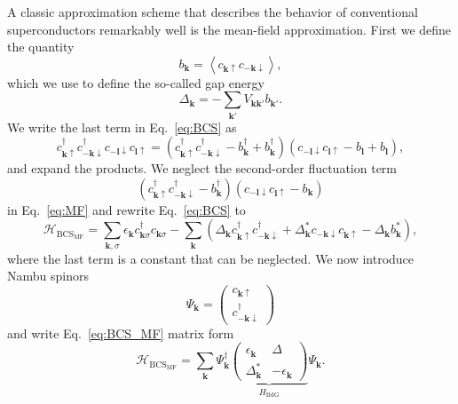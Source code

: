 A classic approximation scheme that describes the behavior of conventional superconductors remarkably well is the mean-field approximation.
First we define the quantity
\begin{equation}
b_{\bm{k}}=\left\langle c_{\bm{k}\uparrow}c_{-\bm{k}\downarrow}\right\rangle ,
\end{equation}
which we use to define the so-called gap energy
\begin{equation}
\Delta_{\bm{k}}=-\sum_{\bm{k'}}V_{\bm{kk'}}b_{\bm{k'}}.
\end{equation}
We write the last term in Eq.~\eqref{eq:BCS} as
\begin{equation}
c_{\bm{k}\uparrow}^{\dagger}c_{-\bm{k}\downarrow}^{\dagger}c_{-\bm{l}\downarrow}c_{\bm{l}\uparrow}=\left(c_{\bm{k}\uparrow}^{\dagger}c_{-\bm{k}\downarrow}^{\dagger}-b_{\bm{k}}^{\dagger}+b_{\bm{k}}^{\dagger}\right)\left(c_{-\bm{l}\downarrow}c_{\bm{l}\uparrow}-b_{\bm{l}}+b_{\bm{l}}\right),\label{eq:MF}
\end{equation}
and expand the products.
We neglect the second-order fluctuation term
\begin{equation}
\left(c_{\bm{k}\uparrow}^{\dagger}c_{-\bm{k}\downarrow}^{\dagger}-b_{\bm{k}}^{\dagger}\right)\left(c_{-\bm{l}\downarrow}c_{\bm{l}\uparrow}-b_{\bm{k}}\right)
\end{equation}
in Eq.~\eqref{eq:MF} and rewrite Eq.~\eqref{eq:BCS} to
\begin{equation}
\mathcal{H}_{\textrm{BCS}_{\textrm{MF}}}=\underset{\bm{k},\sigma}{\sum}\epsilon_{\bm{k}}c_{\bm{k}\sigma}^{\dagger}c_{\bm{k}\sigma}-\underset{\bm{k}}{\sum}\left(\Delta_{\bm{k}}c_{\bm{k}\uparrow}^{\dagger}c_{-\bm{k}\downarrow}^{\dagger}+\Delta_{\bm{k}}^{*}c_{-\bm{k}\downarrow}c_{\bm{k}\uparrow}-\Delta_{\bm{k}}b_{\bm{k}}^{*}\right),\label{eq:BCS_MF}
\end{equation}
where the last term is a constant that can be neglected.
We now introduce Nambu spinors
\begin{equation}
\Psi_{\bm{k}}=\left(\begin{array}{c}
c_{\bm{k}\uparrow}\\
c_{-\bm{k}\downarrow}^{\dagger}
\end{array}\right)\label{eq:Nambu}
\end{equation}
and write Eq.~\eqref{eq:BCS_MF} matrix form
\begin{equation}
\mathcal{H}_{\textrm{BCS}_{\textrm{MF}}}=\underset{\bm{k}}{\sum}\Psi_{\bm{k}}^{\dagger}\underset{H_{\textrm{BdG}}}{\underbrace{\left(\begin{array}{cc}
\epsilon_{\bm{k}} & \Delta\\
\Delta_{\bm{k}}^{*} & -\epsilon_{\bm{k}}
\end{array}\right)}}\Psi_{\bm{k}}.
\end{equation}
